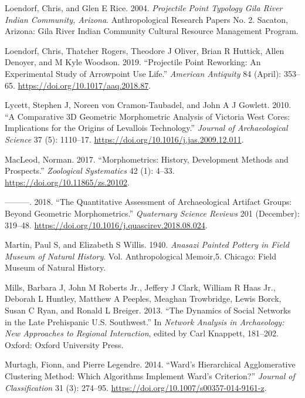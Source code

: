 \documentclass{article}
\newlength{\cslhangindent}
\newlength{\cslentryspacingunit} %
\newenvironment{CSLReferences}[2] %
 {%
  \setlength{\parindent}{0pt}
  \ifodd #1
  \let\oldpar\par
  \def\par{\hangindent=\cslhangindent\oldpar}
  \fi
  \setlength{\parskip}{#2\cslentryspacingunit}
 }%
 {}
\begin{document}
\begin{CSLReferences}{1}{0}
\leavevmode{}%
Loendorf, Chris, and Glen E Rice. 2004. \emph{{Projectile Point Typology
Gila River Indian Community, Arizona}}. Anthropological Research Papers
No. 2. Sacaton, Arizona: Gila River Indian Community Cultural Resource
Management Program.

\leavevmode{}%
Loendorf, Chris, Thatcher Rogers, Theodore J Oliver, Brian R Huttick,
Allen Denoyer, and M Kyle Woodson. 2019. {``{Projectile Point Reworking:
An Experimental Study of Arrowpoint Use Life}.''} \emph{American
Antiquity} 84 (April): 353--65.
\url{https://doi.org/10.1017/aaq.2018.87}.

\leavevmode{}%
Lycett, Stephen J, Noreen von Cramon-Taubadel, and John A J Gowlett.
2010. {``{A Comparative {3D} Geometric Morphometric Analysis of Victoria
West Cores: Implications for the Origins of Levallois Technology}.''}
\emph{Journal of Archaeological Science} 37 (5): 1110--17.
\url{https://doi.org/10.1016/j.jas.2009.12.011}.

\leavevmode{}%
MacLeod, Norman. 2017. {``{Morphometrics: History, Development Methods
and Prospects}.''} \emph{Zoological Systematics} 42 (1): 4--33.
\url{https://doi.org/10.11865/zs.20102}.

\leavevmode{}%
---------. 2018. {``{The Quantitative Assessment of Archaeological
Artifact Groups: Beyond Geometric Morphometrics}.''} \emph{Quaternary
Science Reviews} 201 (December): 319--48.
\url{https://doi.org/10.1016/j.quascirev.2018.08.024}.

\leavevmode{}%
Martin, Paul S, and Elizabeth S Willis. 1940. \emph{{Anasazi Painted
Pottery in Field Museum of Natural History}}. Vol. Anthropological
Memoir,5. Chicago: Field Museum of Natural History.

\leavevmode{}%
Mills, Barbara J, John M Roberts Jr., Jeffery J Clark, William R Haas
Jr., Deborah L Huntley, Matthew A Peeples, Meaghan Trowbridge, Lewis
Borck, Susan C Ryan, and Ronald L Breiger. 2013. {``{The Dynamics of
Social Networks in the Late Prehispanic U.S. Southwest}.''} In
\emph{{Network Analysis in Archaeology: New Approaches to Regional
Interaction}}, edited by Carl Knappett, 181--202. Oxford: Oxford
University Press.

\leavevmode{}%
Murtagh, Fionn, and Pierre Legendre. 2014. {``{Ward's Hierarchical
Agglomerative Clustering Method: Which Algorithms Implement Ward's
Criterion?}''} \emph{Journal of Classification} 31 (3): 274--95.
\url{https://doi.org/10.1007/s00357-014-9161-z}.


\end{CSLReferences}
\end{document}
